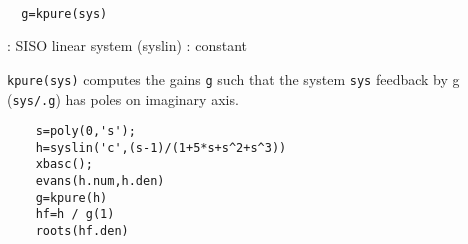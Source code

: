 \begin{mandesc}
   \\ %
\end{mandesc}
\begin{calling_sequence}
\begin{verbatim}
  g=kpure(sys)  
\end{verbatim}
\end{calling_sequence}
\begin{parameters}
  \begin{varlist}
    : SISO linear system (syslin)
    : constant
  \end{varlist}
\end{parameters}
\begin{mandescription}
  \verb!kpure(sys)! computes the gains \verb!g! such that the system
  \verb!sys! feedback by g (\verb!sys/.g!) has  poles on imaginary axis.
\end{mandescription}
\begin{examples}
  \begin{Verbatim}
    s=poly(0,'s');
    h=syslin('c',(s-1)/(1+5*s+s^2+s^3))
    xbasc();
    evans(h.num,h.den)
    g=kpure(h)
    hf=h / g(1)
    roots(hf.den)
  \end{Verbatim}
\end{examples}
\begin{manseealso}
     
\end{manseealso}
